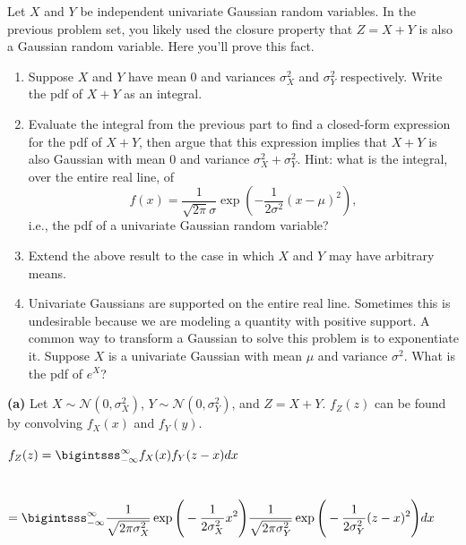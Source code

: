 \documentclass[submit]{harvardml}
\newcommand{\N}{\mathcal{N}}
\begin{document}
\begin{problem}
  Let $X$ and $Y$ be independent univariate Gaussian random
 variables. In the previous problem set, you likely used the closure property that $Z = X + Y$ is also a Gaussian random variable. Here you'll prove this fact.

\begin{enumerate}[label=(\alph*)]
\item Suppose $X$ and $Y$ have mean 0 and variances $\sigma_X^2$ and $\sigma_Y^2$ respectively. Write the pdf of $X + Y$ as an integral.
\item Evaluate the integral from the previous part to find a closed-form expression for the pdf of $X+Y$, then argue that this expression implies that $X+Y$ is also Gaussian with mean $0$ and variance $\sigma_X^2 + \sigma_Y^2$. Hint: what is the integral, over the entire real line, of
\[
f(x) = \frac{1}{\sqrt{2\pi}\sigma} \exp\left( -\frac{1}{2\sigma^2}(x - \mu)^2 \right) ,
\] i.e., the pdf of a univariate Gaussian random variable?
\item Extend the above result to the case in which $X$ and $Y$ may have arbitrary means.
\item Univariate Gaussians are supported on the entire real line. Sometimes this is undesirable because we are modeling a quantity with positive support. A common way to transform a Gaussian to solve this problem is to exponentiate it. Suppose $X$ is a univariate Gaussian with mean $\mu$ and variance $\sigma^2$. What is the pdf of $e^X$?
\end{enumerate}
\vspace{0.1cm}
\end{problem}





\textbf{(a)} Let $X\sim\N(0,\sigma_X^2)$, $Y\sim\N(0,\sigma_Y^2)$, and $Z=X+Y$. $f_Z(z)$ can be found by convolving $f_X(x)$ and $f_Y{(y)}$.\\\\
$f_Z(z)=\displaystyle\bigintsss_{-\infty}^{\infty}f_X(x)f_Y{(z-x)}dx$\\\\\\
$=\displaystyle\bigintsss_{-\infty}^{\infty}\displaystyle\dfrac{1}{\sqrt{2\pi\sigma_X^{2}}}\exp\Bigg(-\displaystyle\dfrac{1}{2\sigma_X^{2}}x^{2}\Bigg)\displaystyle\dfrac{1}{\sqrt{2\pi\sigma_Y^{2}}}\exp\Bigg(-\displaystyle\dfrac{1}{2\sigma_Y^{2}}(z-x)^{2}\Bigg)dx$\\\\\\
\end{document}
